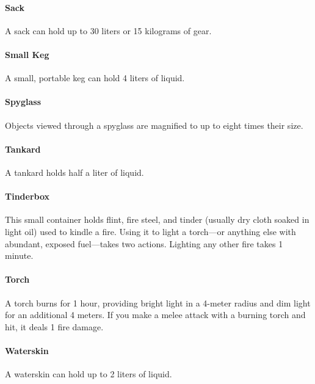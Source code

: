     \paragraph{Sack}
        A sack can hold up to 30 liters or 15 kilograms of gear.
    \paragraph{Small Keg}
        A small, portable keg can hold 4 liters of liquid.
    \paragraph{Spyglass}
        Objects viewed through a spyglass are magnified to up to eight times their size.
    \paragraph{Tankard}
        A tankard holds half a liter of liquid.
    \paragraph{Tinderbox}
        This small container holds flint, fire steel, and tinder (usually dry cloth soaked in light oil) used to kindle a fire.
        Using it to light a torch---or anything else with abundant, exposed fuel---takes two actions.
        Lighting any other fire takes 1 minute.
    \paragraph{Torch}
        A torch burns for 1 hour, providing bright light in a 4-meter radius and dim light for an additional 4 meters.
        If you make a melee attack with a burning torch and hit, it deals 1 fire damage.
    \paragraph{Waterskin}
        A waterskin can hold up to 2 liters of liquid.
\newpage~\newpage
